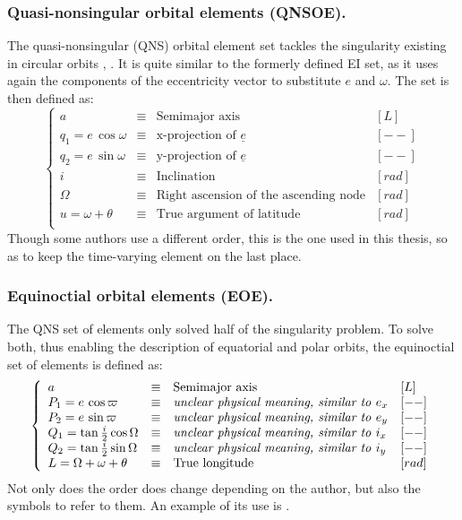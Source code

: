 	\subsubsection{Quasi-nonsingular orbital elements (QNSOE).}
	\indent The quasi-nonsingular (QNS) orbital element set tackles the singularity existing in circular orbits \cite{Gim_Alfriend_equinoctial}, \cite{dAmicoDLR} \cite{Schaub2004}. It is quite similar to the formerly defined EI set, as it uses again the components of the eccentricity vector to substitute $e$ and $\omega$. The set is then defined as: \\
	\begin{equation}
	\left\{ 
	\begin{array}{llll}
	a & \equiv & \text{Semimajor axis} & [L]\\
	q_1 = e\, \cos \omega & \equiv & \text{x-projection of } \underline{e} & [--]\\
	q_2 = e\, \sin \omega & \equiv & \text{y-projection of } \underline{e} & [--]\\
	i & \equiv & \text{Inclination} & [rad]\\
	\Omega & \equiv & \text{Right ascension of the ascending node} & [rad]\\
	u = \omega + \theta & \equiv & \text{True argument of latitude} & [rad]\\
	\end{array}
	\right.
	\end{equation}
	\indent Though some authors use a different order, this is the one used in this thesis, so as to keep the time-varying element on the last place.
	\subsubsection{Equinoctial orbital elements (EOE).}
	\indent The QNS set of elements only solved half of the singularity problem. To solve both, thus enabling the description of equatorial and polar orbits, the equinoctial set of elements is defined as:
	\begin{equation}
	\left\{ 
	\begin{array}{llll}
	a & \equiv & \text{Semimajor axis} & [L]\\
	P_1 = e\, \cos \varpi   & \equiv & \text{\textit{unclear physical meaning, similar to }}e_x & [--]\\
	P_2 = e\, \sin \varpi   & \equiv & \text{\textit{unclear physical meaning, similar to }}e_y & [--]\\
	Q_1 = \tan \frac{i}{2} \cos \Omega  & \equiv & \text{\textit{unclear physical meaning, similar to }} i_x & [--]\\
	Q_2 = \tan \frac{i}{2} \sin \Omega  & \equiv & \text{\textit{unclear physical meaning, similar to }} i_y & [--]\\
	L = \Omega + \omega + \theta & \equiv & \text{True longitude} & [rad]\\
	\end{array}
	\right.
	\end{equation}
	\indent Not only does the order does change depending on the author, but also the symbols to refer to them. An example of its use is \cite{Gim_Alfriend_equinoctial}.
